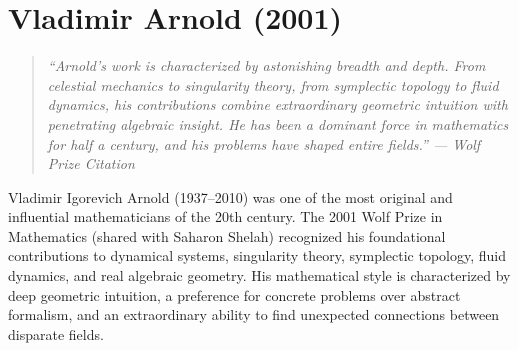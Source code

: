 \let\R\relax
\newcommand{\R}{\mathbb{R}}
\let\C\relax
\newcommand{\C}{\mathbb{C}}
\let\N\relax
\newcommand{\N}{\mathbb{N}}
\let\Z\relax
\newcommand{\Z}{\mathbb{Z}}
\let\Q\relax
\newcommand{\Q}{\mathbb{Q}}
\let\CP\relax
\newcommand{\CP}{\mathbb{CP}}
\let\RP\relax
\newcommand{\RP}{\mathbb{RP}}
\let\T\relax
\newcommand{\T}{\mathbb{T}}
\let\Diff\relax
\newcommand{\Diff}{\operatorname{Diff}}
\let\Ham\relax
\newcommand{\Ham}{\operatorname{Ham}}
\let\Symp\relax
\newcommand{\Symp}{\operatorname{Symp}}
\let\Spec\relax
\newcommand{\Spec}{\operatorname{Spec}}
\let\Fix\relax
\newcommand{\Fix}{\operatorname{Fix}}
\let\Crit\relax
\newcommand{\Crit}{\operatorname{Crit}}
\let\Sing\relax
\newcommand{\Sing}{\operatorname{Sing}}
\let\codim\relax
\newcommand{\codim}{\operatorname{codim}}
\let\supp\relax
\newcommand{\supp}{\operatorname{supp}}
\let\Ad\relax
\newcommand{\Ad}{\operatorname{Ad}}
\let\id\relax
\newcommand{\id}{\operatorname{id}}
\let\const\relax
\newcommand{\const}{\operatorname{const}}
\let\area\relax
\newcommand{\area}{\operatorname{area}}
\let\vol\relax
\newcommand{\vol}{\operatorname{vol}}
\let\Ker\relax
\newcommand{\Ker}{\operatorname{Ker}}
\let\Coker\relax
\newcommand{\Coker}{\operatorname{Coker}}

\chapter{Vladimir Arnold (2001)}

\begin{quote}
\it ``Arnold's work is characterized by astonishing breadth and depth. From celestial mechanics to singularity theory, from symplectic topology to fluid dynamics, his contributions combine extraordinary geometric intuition with penetrating algebraic insight. He has been a dominant force in mathematics for half a century, and his problems have shaped entire fields.'' --- Wolf Prize Citation
\end{quote}

Vladimir Igorevich Arnold (1937--2010) was one of the most original and influential mathematicians of the 20th century. The 2001 Wolf Prize in Mathematics (shared with Saharon Shelah) recognized his foundational contributions to dynamical systems, singularity theory, symplectic topology, fluid dynamics, and real algebraic geometry. His mathematical style is characterized by deep geometric intuition, a preference for concrete problems over abstract formalism, and an extraordinary ability to find unexpected connections between disparate fields.

